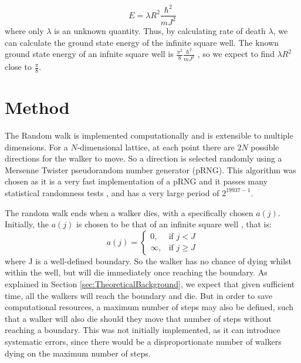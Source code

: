 \documentclass[journal]{IEEEtran}
\begin{document}
\begin{equation}
  E = \lambda R^2 \frac{\hbar^2}{mJ^2}
  \nonumber
\end{equation}
where only $\lambda$ is an unknown quantity. Thus, by calculating rate of death
$\lambda$, we can calculate the ground state energy of the infinite square
well. The known ground state energy of an infnite square well is
$\frac{\pi^2}{8}\frac{\hbar^2}{mJ^2}$ , so we expect to find $\lambda
R^2$ close to $\frac{\pi}{8}$.


\section{Method}

The Random walk is implemented computationally  and is extensible
to multiple dimensions. For a $N$-dimensional lattice, at each point there are
$2N$ possible directions for the walker to move. So a direction is selected
randomly using a Mersenne Twister pseudorandom number generator (pRNG). This algorithm
was chosen as it is a very fast implementation of a pRNG  and it
passes many statistical randomness tests , and has a very large
period of $2^{19937-1}$.

The random walk ends when a walker dies, with a
specifically chosen $a(j)$. Initially, the $a(j)$ is chosen to be that of an
infinite square well , that is:
\begin{equation}
  \label{eq:squarewell}
    a(j) =
    \begin{cases}
      0,& \text{if } j < J\\
      \infty,& \text{if } j \geq J
    \end{cases}
    \nonumber
\end{equation}
where J is a well-defined boundary. So the walker has no chance of dying whilst
within the well, but will die immediately once reaching the boundary. As
explained in Section \ref{sec:TheoreticalBackground}, we expect that given
sufficient time, all the walkers will reach the boundary and die. But in order
to save computational resources, a maximum number of steps may also be defined,
such that a walker will also die should they move that number of steps without
reaching a boundary. This was not initially implemented, as it can introduce
systematic errors, since there would be a disproportionate number of walkers dying
on the maximum number of steps.
\end{document}
